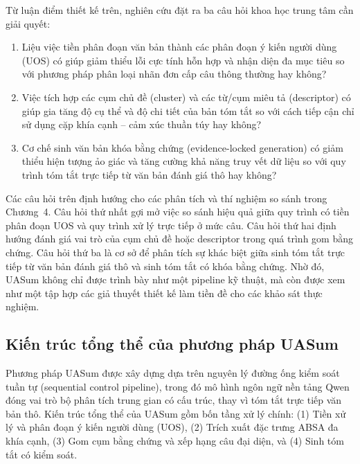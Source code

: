 Từ luận điểm thiết kế trên, nghiên cứu đặt ra ba câu hỏi khoa học trung tâm cần giải quyết:
\begin{enumerate}[leftmargin=1.2cm]
    \item Liệu việc tiền phân đoạn văn bản thành các phân đoạn ý kiến người dùng (UOS) có giúp giảm thiểu lỗi cực tính hỗn hợp và nhận diện đa mục tiêu so với phương pháp phân loại nhãn đơn cấp câu thông thường hay không?
    \item Việc tích hợp các cụm chủ đề (cluster) và các từ/cụm miêu tả (descriptor) có giúp gia tăng độ cụ thể và độ chi tiết của bản tóm tắt so với cách tiếp cận chỉ sử dụng cặp khía cạnh -- cảm xúc thuần túy hay không?
    \item Cơ chế sinh văn bản khóa bằng chứng (evidence-locked generation) có giảm thiểu hiện tượng ảo giác và tăng cường khả năng truy vết dữ liệu so với quy trình tóm tắt trực tiếp từ văn bản đánh giá thô hay không?
\end{enumerate}

Các câu hỏi trên định hướng cho các phân tích và thí nghiệm so sánh trong Chương~4. Câu hỏi thứ nhất gợi mở việc so sánh hiệu quả giữa quy trình có tiền phân đoạn UOS và quy trình xử lý trực tiếp ở mức câu. Câu hỏi thứ hai định hướng đánh giá vai trò của cụm chủ đề hoặc descriptor trong quá trình gom bằng chứng. Câu hỏi thứ ba là cơ sở để phân tích sự khác biệt giữa sinh tóm tắt trực tiếp từ văn bản đánh giá thô và sinh tóm tắt có khóa bằng chứng. Nhờ đó, UASum không chỉ được trình bày như một pipeline kỹ thuật, mà còn được xem như một tập hợp các giả thuyết thiết kế làm tiền đề cho các khảo sát thực nghiệm.

\subsection{Kiến trúc tổng thể của phương pháp UASum}
\label{subsec:method1-overall-summary-architecture}

Phương pháp UASum được xây dựng dựa trên nguyên lý đường ống kiểm soát tuần tự (sequential control pipeline), trong đó mô hình ngôn ngữ nền tảng Qwen đóng vai trò bộ phân tích trung gian có cấu trúc, thay vì tóm tắt trực tiếp văn bản thô. Kiến trúc tổng thể của UASum gồm bốn tầng xử lý chính: (1) Tiền xử lý và phân đoạn ý kiến người dùng (UOS), (2) Trích xuất đặc trưng ABSA đa khía cạnh, (3) Gom cụm bằng chứng và xếp hạng câu đại diện, và (4) Sinh tóm tắt có kiểm soát.

